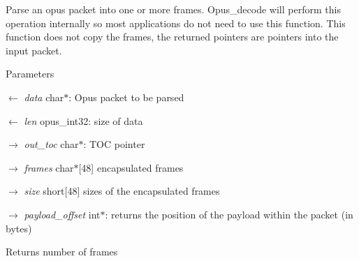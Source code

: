 Parse an opus packet into one or more frames. Opus\_\-decode will perform this operation internally so most applications do not need to use this function. This function does not copy the frames, the returned pointers are pointers into the input packet. 
\begin{DoxyParams}{Parameters}
\item[\mbox{$\leftarrow$} {\em data}]{\ttfamily char$\ast$}: Opus packet to be parsed \item[\mbox{$\leftarrow$} {\em len}]{\ttfamily opus\_\-int32}: size of data \item[\mbox{$\rightarrow$} {\em out\_\-toc}]{\ttfamily char$\ast$}: TOC pointer \item[\mbox{$\rightarrow$} {\em frames}]{\ttfamily char$\ast$\mbox{[}48\mbox{]}} encapsulated frames \item[\mbox{$\rightarrow$} {\em size}]{\ttfamily short\mbox{[}48\mbox{]}} sizes of the encapsulated frames \item[\mbox{$\rightarrow$} {\em payload\_\-offset}]{\ttfamily int$\ast$}: returns the position of the payload within the packet (in bytes) \end{DoxyParams}
\begin{DoxyReturn}{Returns}
number of frames 
\end{DoxyReturn}
